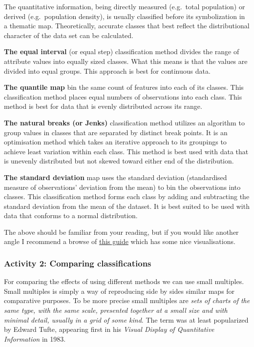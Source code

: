 \documentclass[
]{book}
\begin{document}
The quantitative information, being directly measured (e.g.~total population) or derived (e.g.~population density), is usually classified before its symbolization in a thematic map. Theoretically, accurate classes that best reflect the distributional character of the data set can be calculated.

\textbf{The equal interval} (or equal step) classification method divides the range of attribute values into equally sized classes. What this means is that the values are divided into equal groups. This approach is best for continuous data.

\textbf{The quantile map} bin the same count of features into each of its classes. This classification method places equal numbers of observations into each class. This method is best for data that is evenly distributed across its range.

\textbf{The natural breaks (or Jenks)} classification method utilizes an algorithm to group values in classes that are separated by distinct break points. It is an optimisation method which takes an iterative approach to its groupings to achieve least variation within each class. This method is best used with data that is unevenly distributed but not skewed toward either end of the distribution.

\textbf{The standard deviation} map uses the standard deviation (standardised measure of observations' deviation from the mean) to bin the observations into classes. This classification method forms each class by adding and subtracting the standard deviation from the mean of the dataset. It is best suited to be used with data that conforms to a normal distribution.

The above should be familiar from your reading, but if you would like another angle I recommend a browse of \href{https://gisgeography.com/choropleth-maps-data-classification/}{this guide} which has some nice visualisations.

\hypertarget{activity-2-comparing-classifications}{%
\subsubsection{Activity 2: Comparing classifications}\label{activity-2-comparing-classifications}}

For comparing the effects of using different methods we can use small multiples. Small multiples is simply a way of reproducing side by sides similar maps for comparative purposes. To be more precise small multiples are \emph{sets of charts of the same type, with the same scale, presented together at a small size and with minimal detail, usually in a grid of some kind}. The term was at least popularized by Edward Tufte, appearing first in his \emph{Visual Display of Quantitative Information} in 1983.
\end{document}

